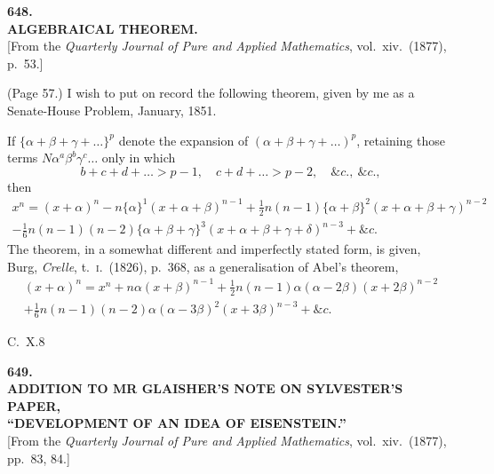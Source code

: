 \documentclass[11pt,a4paper]{article}
\begin{document}
\newpage


\begin{center}
{\Large\bfseries 648.}\\[1em]
{\large\bfseries ALGEBRAICAL THEOREM.}\\[0.5em]
[From the \textit{Quarterly Journal of Pure and Applied Mathematics}, vol.~xiv.\ (1877), p.~53.]
\end{center}

\medskip

\noindent (Page 57.) I wish to put on record the following theorem, given by me as a Senate-House Problem, January, 1851.

If $\{\alpha + \beta + \gamma + \ldots\}^p$ denote the expansion of $(\alpha + \beta + \gamma + \ldots)^p$, retaining those terms $N\alpha^a \beta^b \gamma^c \ldots$ only in which
\[
b + c + d + \ldots > p - 1,\quad c + d + \ldots > p - 2,\quad \&c.,\ \&c.,
\]
then
\begin{multline*}
x^n = (x + \alpha)^n - n\{\alpha\}^1 (x + \alpha + \beta)^{n-1} + \tfrac{1}{2}n(n - 1)\{\alpha + \beta\}^2 (x + \alpha + \beta + \gamma)^{n-2} \\
- \tfrac{1}{6}n(n - 1)(n - 2)\{\alpha + \beta + \gamma\}^3 (x + \alpha + \beta + \gamma + \delta)^{n-3} + \&c.
\end{multline*}
The theorem, in a somewhat different and imperfectly stated form, is given, Burg, \textit{Crelle}, t.~\textsc{i}.\ (1826), p.~368, as a generalisation of Abel's theorem,
\begin{multline*}
(x + \alpha)^n = x^n + n\alpha(x + \beta)^{n-1} + \tfrac{1}{2}n(n - 1)\alpha(\alpha - 2\beta)(x + 2\beta)^{n-2} \\
+ \tfrac{1}{6}n(n - 1)(n - 2)\alpha(\alpha - 3\beta)^2 (x + 3\beta)^{n-3} + \&c.
\end{multline*}

\hfill C.\ X.\hfill 8

\newpage


\begin{center}
{\Large\bfseries 649.}\\[1em]
{\large\bfseries ADDITION TO MR GLAISHER'S NOTE ON SYLVESTER'S PAPER,\\
``DEVELOPMENT OF AN IDEA OF EISENSTEIN.''}\\[0.5em]
[From the \textit{Quarterly Journal of Pure and Applied Mathematics}, vol.~xiv.\ (1877), pp.~83, 84.]
\end{center}
\end{document}
